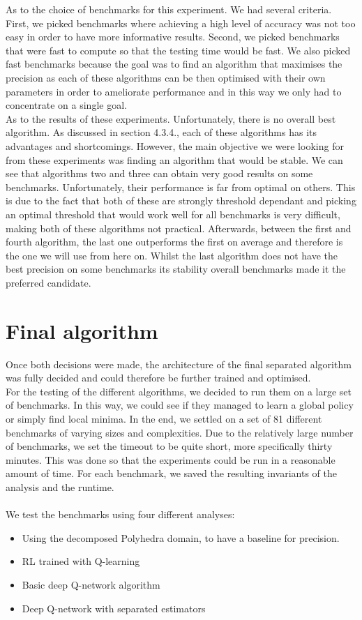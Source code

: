 As to the choice of benchmarks for this experiment. We had several criteria. First, we picked benchmarks where achieving a high level of accuracy was not too easy in order to have more informative results. Second, we picked benchmarks that were fast to compute so that the testing time would be fast. We also picked fast benchmarks because the goal was to find an algorithm that maximises the precision as each of these algorithms can be then optimised with their own parameters in order to ameliorate performance and in this way we only had to concentrate on a single goal.\\
As to the results of these experiments. Unfortunately, there is no overall best algorithm. As discussed in section 4.3.4., each of these algorithms has its advantages and shortcomings. However, the main objective we were looking for from these experiments was finding an algorithm that would be stable. We can see that algorithms two and three can obtain very good results on some benchmarks. Unfortunately, their performance is far from optimal on others. This is due to the fact that both of these are strongly threshold dependant and picking an optimal threshold that would work well for all benchmarks is very difficult, making both of these algorithms not practical. Afterwards, between the first and fourth algorithm, the last one outperforms the first on average and therefore is the one we will use from here on. Whilst the last algorithm does not have the best precision on some benchmarks its stability overall benchmarks made it the preferred candidate.


\section{Final algorithm}
Once both decisions were made, the architecture of the final separated algorithm was fully decided and could therefore be further trained and optimised.\\
For the testing of the different algorithms, we decided to run them on a large set of benchmarks. In this way, we could see if they managed to learn a global policy or simply find local minima. In the end, we settled on a set of 81 different benchmarks of varying sizes and complexities. Due to the relatively large number of benchmarks, we set the timeout to be quite short, more specifically thirty minutes. This was done so that the experiments could be run in a reasonable amount of time. For each benchmark, we saved the resulting invariants of the analysis and the runtime.\\
\mbox{}\\
We test the benchmarks using four different analyses:
\begin{itemize}
    \item Using the decomposed Polyhedra domain, to have a baseline for precision.
    \item RL trained with Q-learning
    \item Basic deep Q-network algorithm
    \item Deep Q-network with separated estimators
\end{itemize}

